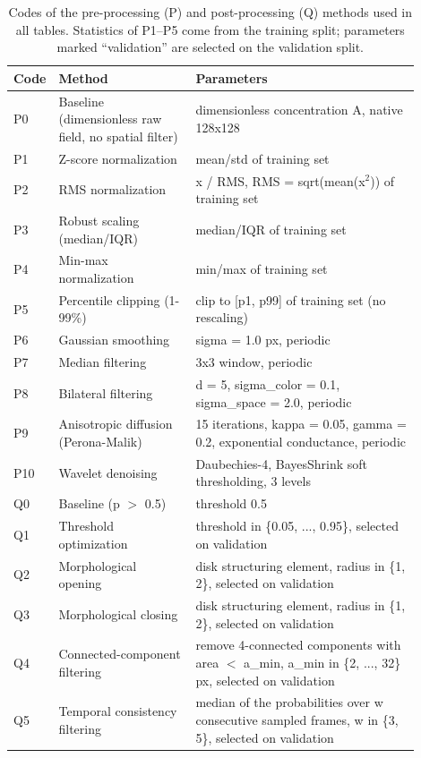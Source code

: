 \begin{table}[h!]
\centering
\caption{Codes of the pre-processing (P) and post-processing (Q) methods used in all tables. Statistics of P1--P5 come from the training split; parameters marked ``validation'' are selected on the validation split.}
\label{tab:methods}
\scriptsize
\begin{tabular}{@{}lp{0.34\linewidth}p{0.56\linewidth}@{}}
\toprule
Code & Method & Parameters \\
\midrule
P0 & Baseline (dimensionless raw field, no spatial filter) & dimensionless concentration A, native 128x128 \\
P1 & Z-score normalization & mean/std of training set \\
P2 & RMS normalization & x / RMS, RMS = sqrt(mean(x$^2$)) of training set \\
P3 & Robust scaling (median/IQR) & median/IQR of training set \\
P4 & Min-max normalization & min/max of training set \\
P5 & Percentile clipping (1-99\%) & clip to [p1, p99] of training set (no rescaling) \\
P6 & Gaussian smoothing & sigma = 1.0 px, periodic \\
P7 & Median filtering & 3x3 window, periodic \\
P8 & Bilateral filtering & d = 5, sigma\_color = 0.1, sigma\_space = 2.0, periodic \\
P9 & Anisotropic diffusion (Perona-Malik) & 15 iterations, kappa = 0.05, gamma = 0.2, exponential conductance, periodic \\
P10 & Wavelet denoising & Daubechies-4, BayesShrink soft thresholding, 3 levels \\
\midrule
Q0 & Baseline (p $>$ 0.5) & threshold 0.5 \\
Q1 & Threshold optimization & threshold in \{0.05, ..., 0.95\}, selected on validation \\
Q2 & Morphological opening & disk structuring element, radius in \{1, 2\}, selected on validation \\
Q3 & Morphological closing & disk structuring element, radius in \{1, 2\}, selected on validation \\
Q4 & Connected-component filtering & remove 4-connected components with area $<$ a\_min, a\_min in \{2, ..., 32\} px, selected on validation \\
Q5 & Temporal consistency filtering & median of the probabilities over w consecutive sampled frames, w in \{3, 5\}, selected on validation \\
\bottomrule
\end{tabular}
\end{table}
